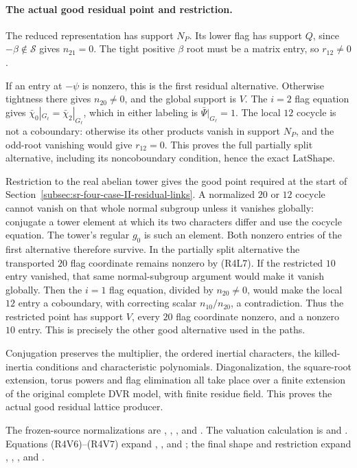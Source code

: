 \paragraph{The actual good residual point and restriction.}
The reduced representation has support \(N_P\).
Its lower flag has support \(Q\), since
\(-\beta\notin\mathcal S\) gives \(n_{21}=0\).
The tight positive \(\beta\) root must be a matrix entry,
so \(r_{12}\ne0\).

If an entry at \(-\psi\) is nonzero, this is the first
residual alternative.
Otherwise tightness there gives \(n_{20}\ne0\), and the
global support is \(V\).
The \(i=2\) flag equation gives
\(\bar\chi_0|_{G_\ell}=\bar\chi_2|_{G_\ell}\),
which in either labeling is \(\bar\Psi|_{G_\ell}=1\).
The local \(12\) cocycle is not a coboundary:
otherwise its other products vanish in support \(N_P\),
and the odd-root vanishing would give \(r_{12}=0\).
This proves the full partially split alternative, including
its noncoboundary condition, hence the exact
\(\mathrm{LatShape}\).

Restriction to the real abelian tower gives the good point
required at the start of
Section~\ref{subsec:sr-four-case-II-residual-links}.
A normalized \(20\) or \(12\) cocycle cannot vanish on that
whole normal subgroup unless it vanishes globally:
conjugate a tower element at which its two characters differ
and use the cocycle equation.
The tower's regular \(g_0\) is such an element.
Both nonzero entries of the first alternative therefore
survive.
In the partially split alternative the transported \(20\)
flag coordinate remains nonzero by (R4L7).
If the restricted \(10\) entry vanished, that same
normal-subgroup argument would make it vanish globally.
Then the \(i=1\) flag equation, divided by \(n_{20}\ne0\),
would make the local \(12\) entry a coboundary, with correcting
scalar \(n_{10}/n_{20}\), a contradiction.
Thus the restricted point has support \(V\), every \(20\)
flag coordinate nonzero, and a nonzero \(10\) entry.
This is precisely the other good alternative used in the paths.

Conjugation preserves the multiplier, the ordered inertial
characters, the killed-inertia conditions and characteristic
polynomials.
Diagonalization, the square-root extension, torus powers and
flag elimination all take place over a finite extension of
the original complete DVR model, with finite residue field.
This proves the actual good residual lattice producer.

The frozen-source normalizations are
, ,
, and .
The valuation calculation is
 and
.
Equations (R4V6)--(R4V7) expand
, , and ;
the final shape and restriction expand ,
, , and .
